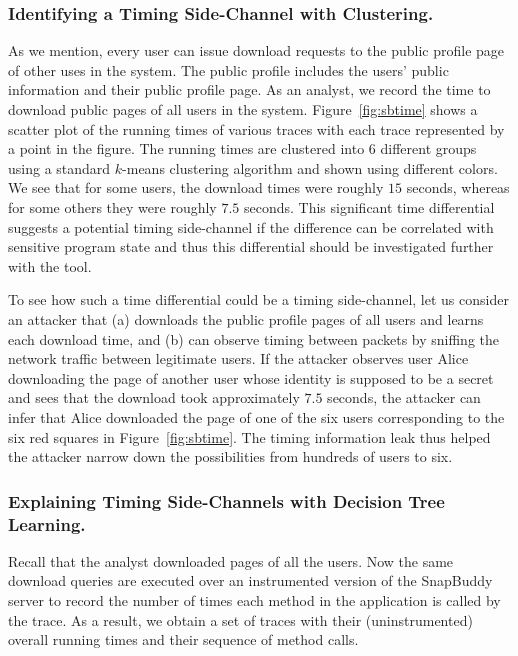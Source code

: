 \documentclass{article}
\begin{document}
\subsubsection*{Identifying a Timing Side-Channel with Clustering.}
As we mention, every user can issue download requests to the
public profile page of other uses in the system. The public profile
includes the users' public information and their public profile page. 
As an analyst, we record the time to download public pages of all users
in the system. Figure~\ref{fig:sbtime} shows a scatter plot of the running times of
various traces with each trace represented by a point in the figure. The
running times are clustered into $6$ different groups using a
standard $k$-means clustering algorithm and shown using different
colors. We see that for some users, the download times were roughly $15$ seconds, whereas for
some others they were roughly $7.5$ seconds. This significant time differential suggests a
potential timing side-channel if the difference can be correlated with sensitive
program state and thus this differential should be investigated further with the tool.

To see how such a time differential could be a timing side-channel,
let us consider an attacker that
(a) downloads the public profile pages of all users and learns each download time,
and (b) can observe timing between packets by sniffing the
network traffic between legitimate users.
If the attacker observes user Alice downloading the page of another user whose identity
is supposed to be a secret
and sees that the download took approximately $7.5$ seconds, the attacker can infer
that Alice downloaded the page of one of the six users corresponding
to the six red squares in Figure~\ref{fig:sbtime}. The timing
information leak thus helped the attacker narrow down the
possibilities from hundreds of users to six.

\subsubsection*{Explaining Timing Side-Channels with Decision Tree Learning.}
Recall that the analyst downloaded pages
of all the users. Now the same download queries are executed over an
instrumented version of the SnapBuddy server to record the number of
times each method in the application is called by the trace. As a
result, we obtain a
set of traces with their (uninstrumented) overall running times and their
sequence of method calls.
\end{document}
